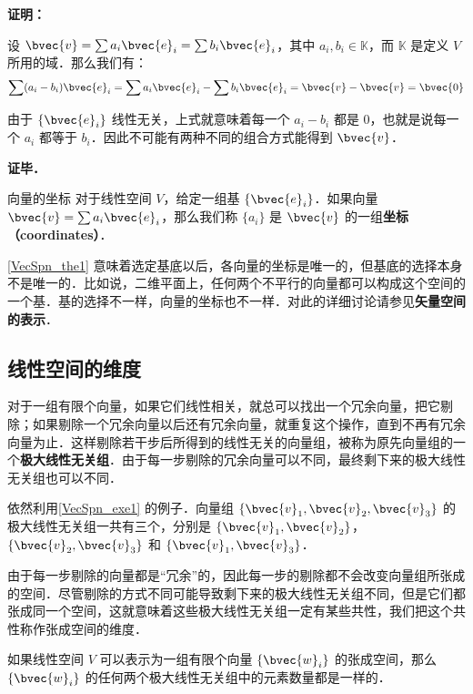 \textbf{证明：}

设 $\bvec{v}=\sum a_i\bvec{e}_i=\sum b_i\bvec{e}_i$，其中 $a_i, b_i\in \mathbb{K}$，而 $\mathbb{K}$ 是定义 $V$ 所用的域．那么我们有：
\begin{equation}
\sum(a_i-b_i)\bvec{e}_i=\sum a_i\bvec{e}_i-\sum b_i\bvec{e}_i=\bvec{v}-\bvec{v}=\bvec{0}
\end{equation}

由于 $\{\bvec{e}_i\}$ 线性无关，上式就意味着每一个 $a_i-b_i$ 都是 $0$，也就是说每一个 $a_i$ 都等于 $b_i$．因此不可能有两种不同的组合方式能得到 $\bvec{v}$．

\textbf{证毕．}

\begin{definition}{向量的坐标}
对于线性空间 $V$，给定一组基 $\{\bvec{e}_i\}$．如果向量 $\bvec{v}=\sum a_i\bvec{e}_i$，那么我们称 $\{a_i\}$ 是 $\bvec{v}$ 的一组\textbf{坐标（coordinates）}．
\end{definition}

\autoref{VecSpn_the1} 意味着选定基底以后，各向量的坐标是唯一的，但基底的选择本身不是唯一的．比如说，二维平面上，任何两个不平行的向量都可以构成这个空间的一个基．基的选择不一样，向量的坐标也不一样．对此的详细讨论请参见\textbf{矢量空间的表示}．

\subsection{线性空间的维度}

对于一组有限个向量，如果它们线性相关，就总可以找出一个冗余向量，把它剔除；如果剔除一个冗余向量以后还有冗余向量，就重复这个操作，直到不再有冗余向量为止．这样剔除若干步后所得到的线性无关的向量组，被称为原先向量组的一个\textbf{极大线性无关组}．由于每一步剔除的冗余向量可以不同，最终剩下来的极大线性无关组也可以不同．

\begin{example}{}
依然利用\autoref{VecSpn_exe1} 的例子．向量组 $\{\bvec{v}_1, \bvec{v}_2, \bvec{v}_3\}$ 的极大线性无关组一共有三个，分别是 $\{\bvec{v}_1, \bvec{v}_2\}$，$\{\bvec{v}_2, \bvec{v}_3\}$ 和 $\{\bvec{v}_1, \bvec{v}_3\}$．
\end{example}

由于每一步剔除的向量都是“冗余”的，因此每一步的剔除都不会改变向量组所张成的空间．尽管剔除的方式不同可能导致剩下来的极大线性无关组不同，但是它们都张成同一个空间，这就意味着这些极大线性无关组一定有某些共性，我们把这个共性称作张成空间的维度．

\begin{theorem}{}\label{VecSpn_the2}
如果线性空间 $V$ 可以表示为一组有限个向量 $\{\bvec{w}_i\}$ 的张成空间，那么 $\{\bvec{w}_i\}$ 的任何两个极大线性无关组中的元素数量都是一样的．
\end{theorem}

